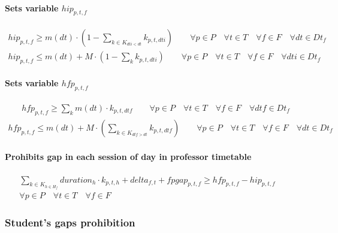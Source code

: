 \paragraph{Sets variable $hip_{p,t,f}$}
\begin{eqnarray}
hip_{p,t,f} \geq m(dt) \cdot ( 1 - \sum\limits_{k \in K_{dti<dt}} k_{p,t,dti} ) \nonumber \qquad
\forall p \in P \quad
\forall t \in T \quad
\forall f \in F \quad
\forall dt \in Dt_{f}
\end{eqnarray}
\begin{eqnarray}
hip_{p,t,f} \leq m(dt) + M \cdot ( 1 - \sum\limits_{k} k_{p,t,dti} ) \nonumber \qquad
\forall p \in P \quad
\forall t \in T \quad
\forall f \in F \quad
\forall dti \in Dt_{f}
\end{eqnarray}

\paragraph{Sets variable $hfp_{p,t,f}$}
\begin{eqnarray}
hfp_{p,t,f} \geq \sum\limits_{k} m(dt) \cdot k_{p,t,dtf} \nonumber \qquad
\forall p \in P \quad
\forall t \in T \quad
\forall f \in F \quad
\forall dtf \in Dt_{f}
\end{eqnarray}
\begin{eqnarray}
hfp_{p,t,f} \leq m(dt) + M \cdot ( \sum\limits_{k \in K_{dtf>dt}} k_{p,t,dtf} ) \nonumber \qquad
\forall p \in P \quad
\forall t \in T \quad
\forall f \in F \quad
\forall dt \in Dt_{f}
\end{eqnarray}

\paragraph{Prohibits gap in each session of day in professor timetable}
\begin{eqnarray}
\sum\limits_{k \in K_{h \in H_{f}}} duration_{h} \cdot k_{p,t,h} + delta_{f,t} + fpgap_{p,t,f} \geq hfp_{p,t,f} - hip_{p,t,f} \nonumber \qquad
\\
\forall p \in P \quad
\forall t \in T \quad
\forall f \in F \quad
\end{eqnarray}


\subsubsection{Student's gaps prohibition}
\label{constrStudentGap}

